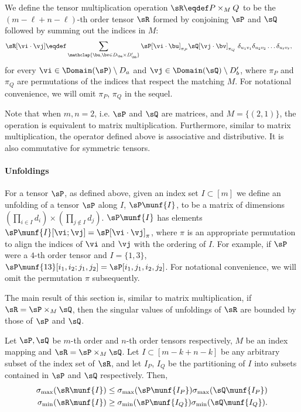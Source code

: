\begin{definition}
  We define the tensor multiplication operation $\sR \eqdef P \times_{M}
  Q$ to be the $(m - \ell + n - \ell)$-th order tensor $\sR$ formed by
  conjoining $\sP$ and $\sQ$ followed by summing out the indices in $M$:
\begin{align*}
  \sR[\vi\cdot\vj] &\eqdef \sum_{\mathclap{\bu, \bv \in D_\ba \times D'_\bb}} \sP[\vi \cdot \bu]_{\pi_P} \sQ[\vj \cdot \bv]_{\pi_Q} ~ \delta_{u_1 v_1} \delta_{u_2 v_2} \ldots \delta_{u_\ell v_\ell},
\end{align*}
  for every $\vi \in \Domain(\sP) \setminus D_a$ and $\vj \in
  \Domain(\sQ) \setminus D'_b$, where $\pi_P$ and $\pi_Q$ are
  permutations of the indices that respect the matching $M$. For
  notational convenience, we will omit $\pi_P$, $\pi_Q$ in the sequel.
\end{definition}

Note that when $m, n = 2$, i.e. $\sP$ and $\sQ$ are matrices, and $M
  = \{(2,1)\}$, the operation is equivalent to matrix multiplication. 
Furthermore, similar to matrix multiplication, the operator defined above
  is associative and distributive. 
It is also commutative for symmetric tensors.

\paragraph{Unfoldings}
For a tensor $\sP$, as defined above, 
  given an index set $I \subset [m]$ we
  define an unfolding of a tensor $\sP$ along $I$,
 $\sP\munf{I}$, to be a matrix of dimensions $(\prod_{i \in I} d_i)
 \times (\prod_{j \not\in I} d_j)$. $\sP\munf{I}$ has elements
 $\sP\munf{I}[\vi;\vj] = \sP[\vi\cdot\vj]_{\pi}$, where $\pi$ is an
 appropriate permutation to align the indices of $\vi$ and $\vj$ with
 the ordering of $I$. 
For example, if $\sP$ were a $4$-th order tensor and $I = \{1,3\}$,
  $\sP\munf{13}[i_1,i_2; j_1,j_2] = \sP[i_1,j_1,i_2,j_2]$.
For notational convenience, we will omit the permutation $\pi$ subsequently.

The main result of this section is, similar to matrix multiplication, if
$\sR = \sP \times_{M} \sQ$, then the singular values of unfoldings
of $\sR$ are bounded by those of $\sP$ and $\sQ$.

\begin{lemma}
  \label{lem:tensor-multiplication}
Let $\sP, \sQ$ be $m$-th order and $n$-th order tensors respectively, $M$ be an
  index mapping and $\sR = \sP \times_M \sQ$. 
Let $I \subset [m - k + n - k]$ be any arbitrary subset of the index set
  of $\sR$,
and let $I_P$, $I_Q$ be the partitioning of $I$ into subsets contained
  in $\sP$ and $\sQ$ respectively.
Then,
\begin{align*}
\sigma_{\max}(\sR\munf{I}) &\le \sigma_{\max}(\sP\munf{I_P}) \sigma_{\max}(\sQ\munf{I_P}) \\
\sigma_{\min}(\sR\munf{I}) &\ge \sigma_{\min}(\sP\munf{I_Q}) \sigma_{\min}(\sQ\munf{I_Q}).
\end{align*}
\end{lemma}

